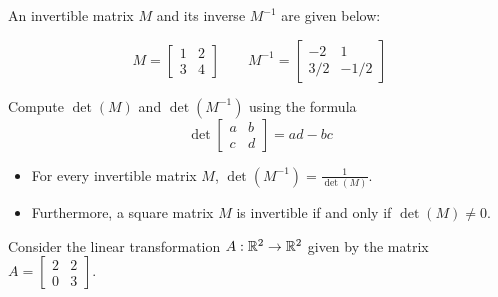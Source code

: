 \begin{applicationActivities}

\begin{activity}{5}
  An invertible matrix \(M\) and its inverse \(M^{-1}\) are given below:

  \[
    M=\begin{bmatrix}1&2\\3&4\end{bmatrix}
  \hspace{2em}
    M^{-1}=\begin{bmatrix}-2&1\\3/2&-1/2\end{bmatrix}
  \]

\vspace{1em}

  Compute \(\det(M)\) and \(\det(M^{-1})\)
  using the formula
\[
  \det\begin{bmatrix}a & b \\ c & d\end{bmatrix}=ad-bc
\]
\end{activity}

\begin{fact}
  \begin{itemize}
\item   For every invertible matrix \(M\),
  \(\det(M^{-1})=\frac{1}{\det(M)}\).

\item  Furthermore,
  a square matrix \(M\) is invertible if and only if \(\det(M)\not=0\).
  \end{itemize}
\end{fact}

\begin{observation}
Consider the linear transformation \(A : \mathbb{R}^2 \rightarrow \mathbb{R}^2\) 
given by the matrix \(A = \begin{bmatrix} 2 & 2 \\ 0 & 3 \end{bmatrix}\).


\end{observation}
\end{applicationActivities}
